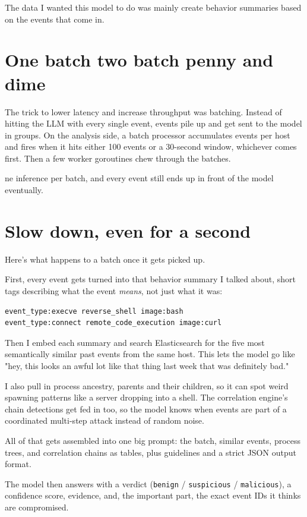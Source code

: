 The data I wanted this model to do was mainly create behavior summaries based on the events that come in.

\section{One batch two batch penny and dime}

The trick to lower latency and increase throughput was batching. Instead of hitting the LLM with every single event, events pile up and get sent to the model in groups. On the analysis side, a batch processor accumulates events per host and fires when it hits either 100 events or a 30-second window, whichever comes first. Then a few worker goroutines chew through the batches.

ne inference per batch, and every event still ends up in front of the model eventually.

\section{Slow down, even for a second}

Here's what happens to a batch once it gets picked up.

First, every event gets turned into that behavior summary I talked about, short tags describing what the event \textit{means}, not just what it was:

\begin{verbatim}
event_type:execve reverse_shell image:bash
event_type:connect remote_code_execution image:curl
\end{verbatim}

Then I embed each summary and search Elasticsearch for the five most semantically similar past events from the same host. This lets the model go like "hey, this looks an awful lot like that thing last week that was definitely bad."

I also pull in process ancestry, parents and their children, so it can spot weird spawning patterns like a server dropping into a shell. The correlation engine's chain detections get fed in too, so the model knows when events are part of a coordinated multi-step attack instead of random noise.

All of that gets assembled into one big prompt: the batch, similar events, process trees, and correlation chains as tables, plus guidelines and a strict JSON output format.

The model then answers with a verdict (\texttt{benign} / \texttt{suspicious} / \texttt{malicious}), a confidence score, evidence, and, the important part, the exact event IDs it thinks are compromised.

